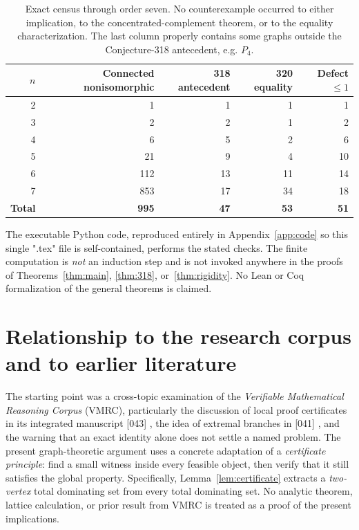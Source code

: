 \documentclass[11pt,a4paper]{article}
\theoremstyle{definition}\newtheorem{definition}[theorem]{Definition}
\theoremstyle{remark}\newtheorem{remark}[theorem]{Remark}
\begin{document}
\begin{table}[ht]
\centering\small
\begin{tabular}{@{}rrrrr@{}}\toprule
$n$&Connected nonisomorphic&318 antecedent&320 equality&Defect $\le1$\\\midrule
2&1&1&1&1\\
3&2&2&1&2\\
4&6&5&2&6\\
5&21&9&4&10\\
6&112&13&11&14\\
7&853&17&34&18\\\midrule
\textbf{Total}&\textbf{995}&\textbf{47}&\textbf{53}&\textbf{51}\\\bottomrule
\end{tabular}
\caption{Exact census through order seven. No counterexample occurred to either implication, to the concentrated-complement theorem, or to the equality characterization. The last column properly contains some graphs outside the Conjecture-318 antecedent, e.g. $P_4$.}
\label{tab:audit}
\end{table}
The executable Python code, reproduced entirely in Appendix~\ref{app:code} so this single ".tex" file is self-contained, performs the stated checks. The finite computation is \emph{not} an induction step and is not invoked anywhere in the proofs of Theorems~\ref{thm:main}, \ref{thm:318}, or~\ref{thm:rigidity}. No Lean or Coq formalization of the general theorems is claimed.

\section{Relationship to the research corpus and to earlier literature}
The starting point was a cross-topic examination of the \emph{Verifiable Mathematical Reasoning Corpus} (VMRC), particularly the discussion of local proof certificates in its integrated manuscript [043] \cite{VMRC043}, the idea of extremal branches in [041] \cite{VMRC041}, and the warning that an exact identity alone does not settle a named problem. The present graph-theoretic argument uses a concrete adaptation of a \emph{certificate principle}: find a small witness inside every feasible object, then verify that it still satisfies the global property. Specifically, Lemma~\ref{lem:certificate} extracts a \emph{two-vertex} total dominating set from every total dominating set. No analytic theorem, lattice calculation, or prior result from VMRC is treated as a proof of the present implications.
\end{document}
